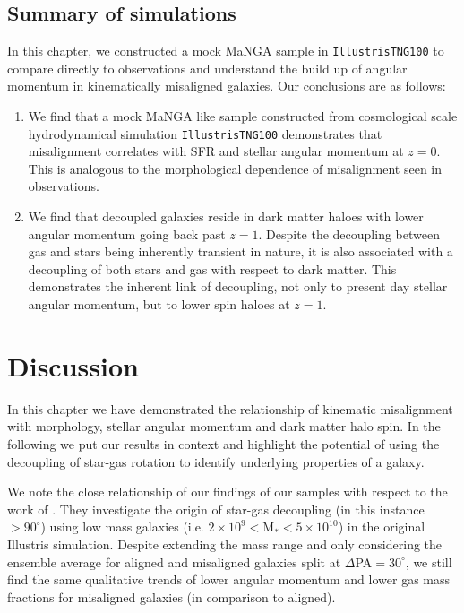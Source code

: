 \subsection{Summary of simulations} \label{sec:tng_summary}
In this chapter, we constructed a mock MaNGA sample in \texttt{IllustrisTNG100} to compare directly to observations and understand the build up of angular momentum in kinematically misaligned galaxies. Our conclusions are as follows:
\begin{enumerate}
    \item We find that a mock MaNGA like sample constructed from cosmological scale hydrodynamical simulation \texttt{IllustrisTNG100} demonstrates that misalignment correlates with SFR and stellar angular momentum at $z=0$. This is analogous to the morphological dependence of misalignment seen in observations.
    
    \item We find that decoupled galaxies reside in dark matter haloes with lower angular momentum going back past $z=1$. Despite the decoupling between gas and stars being inherently transient in nature, it is also associated with a decoupling of both stars and gas with respect to dark matter. This demonstrates the inherent link of decoupling, not only to present day stellar angular momentum, but to lower spin haloes at $z=1$. 

\end{enumerate}

\section{Discussion} \label{sec:tng_discussion}
In this chapter we have demonstrated the relationship of kinematic misalignment with morphology, stellar angular momentum and dark matter halo spin. In the following we put our results in context and highlight the potential of using the decoupling of star-gas rotation to identify underlying properties of a galaxy. 

We note the close relationship of our findings of our samples with respect to the work of \citet{starkenburg+19}. They investigate the origin of star-gas decoupling (in this instance $ > 90^{\circ}$) using low mass galaxies (i.e. $2 \times \mathrm{10^{9} < M_{\ast} < 5 \times 10^{10}}$) in the original Illustris simulation. Despite extending the mass range and only considering the ensemble average for aligned and misaligned galaxies split at $\Delta$PA$ = 30^{\circ}$, we still find the same qualitative trends of lower angular momentum and lower gas mass fractions for misaligned galaxies (in comparison to aligned). 

